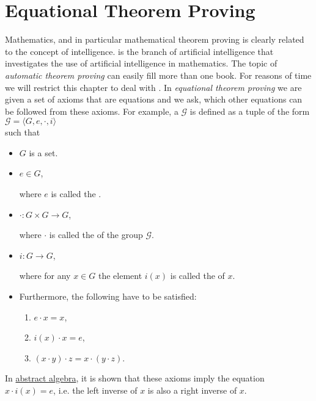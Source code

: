 \chapter{Equational Theorem Proving}
Mathematics, and in particular mathematical theorem proving is clearly related to the concept of intelligence.
 is the branch of artificial intelligence that investigates the use of
artificial intelligence in mathematics.  The topic of \emph{automatic theorem proving} can easily fill more
than one book.  For reasons of time we will restrict this chapter to deal with .  In
\emph{equational theorem proving} we are given a set of axioms that are equations and we ask, which other
equations can be followed from these axioms.  For example, a  $\mathcal{G}$ is defined as a tuple
of the form
\\[0.2cm]
\hspace*{1.3cm}
$\mathcal{G} = \langle G, e, \cdot, i \rangle$
\\[0.2cm]
such that
\begin{itemize}
\item $G$ is a set.
\item $e \in G$,

      where $e$ is called the .
\item $\cdot: G \times G \rightarrow G$,

      where $\cdot$ is called the  of the group $\mathcal{G}$.
\item $i: G \rightarrow G$,

      where for any $x \in G$ the element $i(x)$ is called the  of $x$.
\item Furthermore, the following  have to be satisfied:
      \begin{enumerate}
      \item $e \cdot x = x$, 
      \item $i(x) \cdot x = e$, 
      \item $(x \cdot y) \cdot z = x \cdot (y \cdot z)$.
      \end{enumerate}
\end{itemize}
In \href{https://en.wikipedia.org/wiki/Abstract_algebra}{abstract algebra}, it is shown that these axioms imply
the equation 
\\[0.2cm]
\hspace*{1.3cm}
$x \cdot i(x) = e$, \quad i.e. the left inverse of $x$ is also a right inverse of $x$.
